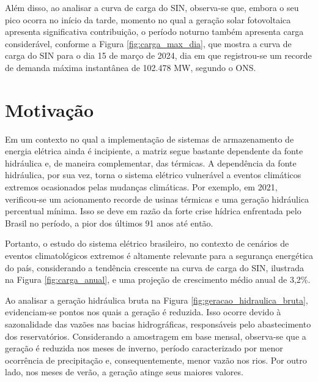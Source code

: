 Além disso, ao analisar a curva de carga do SIN, observa-se que, embora o seu pico ocorra no início da 
tarde, momento no qual a geração solar fotovoltaica apresenta significativa contribuição, o período noturno também 
apresenta carga considerável, conforme a Figura \ref{fig:carga_max_dia}, que mostra a curva de carga do SIN para o 
dia 15 de março de 2024, dia em que registrou-se um recorde de demanda máxima instantânea de 102.478 MW, segundo o ONS.

\begin{figure}[!ht]
	{}
	{}
\end{figure}

\section{Motivação}
Em um contexto no qual a implementação de sistemas de armazenamento de energia elétrica ainda é incipiente,
a matriz segue bastante dependente da fonte hidráulica e, de maneira complementar, das térmicas. A dependência da fonte
hidráulica, por sua vez, torna o sistema elétrico vulnerável a eventos climáticos extremos ocasionados pelas mudanças
climáticas. Por exemplo, em 2021, verificou-se um acionamento recorde de usinas térmicas e uma geração hidráulica 
percentual mínima. Isso se deve em razão da forte crise hídrica enfrentada pelo Brasil no período, a pior dos últimos 91 anos
até então. \cite{Soares2023}

\begin{figure}[!ht]
	{}
	{}
\end{figure}

Portanto, o estudo do sistema elétrico brasileiro, no contexto de cenários de eventos
climatológicos extremos é altamente relevante para a segurança energética do país, considerando a tendência crescente
na curva de carga do SIN, ilustrada na Figura \ref{fig:carga_anual}, e uma projeção de crescimento médio anual de 3,2\%. \cite{pen2024}

Ao analisar a geração hidráulica bruta na Figura \ref{fig:geracao_hidraulica_bruta}, evidenciam-se pontos nos 
quais a geração é reduzida. Isso ocorre devido à sazonalidade das vazões nas bacias hidrográficas, responsáveis pelo 
abastecimento dos reservatórios. Considerando a amostragem em base mensal, observa-se que a geração é reduzida nos meses
de inverno, período caracterizado por menor ocorrência de precipitação e, consequentemente, menor vazão nos rios. Por
outro lado, nos meses de verão, a geração atinge seus maiores valores.

